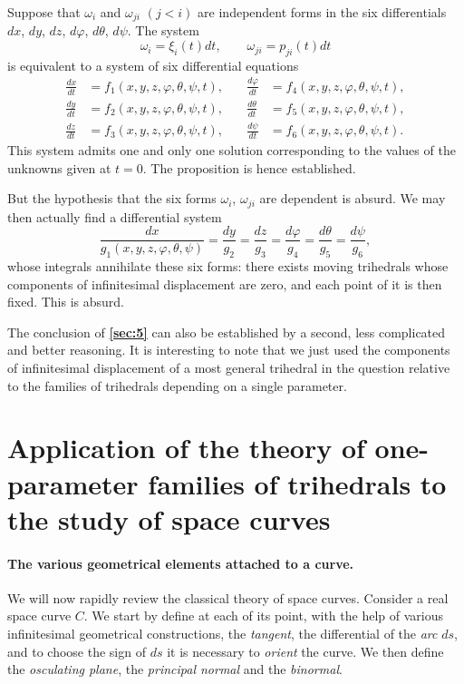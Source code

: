 \documentclass[leqno,11pt]{book}
\makeatletter
\numberwithin{equation}{chapter}
\theoremstyle{shape1}
\theoremstyle{shapesmall}
\let\old@phi\phi
\let\old@varphi\varphi
\let\phi\old@varphi
\let\varphi\old@phi
\newcommand{\fsref}[1]{{\rm\textsection\textbf{\ref{sec:#1}}}}
\makeatother
\begin{document}
Suppose that $\omega_{i}$ and $\omega_{ji}$ $(j<i)$ are independent forms in the six differentials $dx$, $dy$, $dz$, $d\phi$, $d\theta$, $d\psi$. The system
\[
\omega_{i}=\xi_{i}(t)dt,\qquad\omega_{ji}=p_{ji}(t)dt
\]
is equivalent to a system of six differential equations
\begin{align*}
  \frac{dx}{dt}&=f_{1}(x,y,z,\phi,\theta,\psi,t),\quad&
  \frac{d\phi}{dt}&=f_{4}(x,y,z,\phi,\theta,\psi,t),\\
  \frac{dy}{dt}&=f_{2}(x,y,z,\phi,\theta,\psi,t),\quad&
  \frac{d\theta}{dt}&=f_{5}(x,y,z,\phi,\theta,\psi,t),\\
  \frac{dz}{dt}&=f_{3}(x,y,z,\phi,\theta,\psi,t),\quad&
  \frac{d\psi}{dt}&=f_{6}(x,y,z,\phi,\theta,\psi,t).  
\end{align*}
This system admits one and only one solution corresponding to the values of the unknowns given at $t=0$. The proposition is hence established.

But the hypothesis that the six forms $\omega_{i}$, $\omega_{ji}$ are dependent is absurd. We may then actually find a differential system
\[
\frac{dx}{g_{1}(x,y,z,\phi,\theta,\psi)}=\frac{dy}{g_{2}}=\frac{dz}{g_{3}}=\frac{d\phi}{g_{4}}=\frac{d\theta}{g_{5}}=\frac{d\psi}{g_{6}},
\]
whose integrals annihilate these six forms: there exists moving trihedrals whose components of infinitesimal displacement are zero, and each point of it is then fixed. This is absurd.

The conclusion of \fsref{5} can also be established by a second, less complicated and better reasoning. It is interesting to note that we just used the components of infinitesimal displacement of a most general trihedral in the question relative to the families of trihedrals depending on a single parameter.

\section[{Application of the theory of one-parameter families of trihedrals to space curves}]{Application of the theory of one-parameter families of trihedrals to the study of space curves}
\label{sec:appl-theory-one}

\paragraph{The various geometrical elements attached to a curve.}
\label{sec:9}
We will now rapidly review the classical theory of space curves. Consider a real space curve $C$. We start by define at each of its point, with the help of various infinitesimal geometrical constructions, the \emph{tangent}, the differential of the \emph{arc} $ds$, and to choose the sign of $ds$ it is necessary to \emph{orient} the curve. We then define the \emph{osculating plane}, the \emph{principal normal} and the \emph{binormal}.
\end{document}
